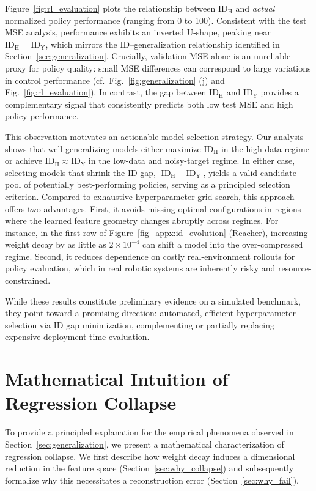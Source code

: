 \documentclass{article}
\newcommand{\idh}{\ensuremath{\mathrm{ID}_{\mathrm{H}}}}
\newcommand{\idy}{\ensuremath{\mathrm{ID}_{\mathrm{Y}}}}
\theoremstyle{plain}
\theoremstyle{definition}
\theoremstyle{remark}
\begin{document}
Figure~\ref{fig:rl_evaluation} plots the relationship between $\idh$ and \emph{actual} normalized policy performance (ranging from 0 to 100). Consistent with the test MSE analysis, performance exhibits an inverted U-shape, peaking near $\idh = \idy$, which mirrors the ID--generalization relationship identified in Section~\ref{sec:generalization}. Crucially, validation MSE alone is an unreliable proxy for policy quality: small MSE differences can correspond to large variations in control performance (cf.\ Fig.~\ref{fig:generalization} (j) and Fig.~\ref{fig:rl_evaluation}). In contrast, the gap between $\idh$ and $\idy$ provides a complementary signal that consistently predicts both low test MSE and high policy performance.

This observation motivates an actionable model selection strategy. Our analysis shows that well-generalizing models either maximize $\idh$ in the high-data regime or achieve $\idh \approx \idy$ in the low-data and noisy-target regime. In either case, selecting models that shrink the ID gap, $|\idh - \idy|$, yields a valid candidate pool of potentially best-performing policies, serving as a principled selection criterion. Compared to exhaustive hyperparameter grid search, this approach offers two advantages. First, it avoids missing optimal configurations in regions where the learned feature geometry changes abruptly across regimes. For instance, in the first row of Figure~\ref{fig_appx:id_evolution} (Reacher), increasing weight decay by as little as $2 \times 10^{-4}$ can shift a model into the over-compressed regime. Second, it reduces dependence on costly real-environment rollouts for policy evaluation, which in real robotic systems are inherently risky and resource-constrained.

While these results constitute preliminary evidence on a simulated benchmark, they point toward a promising direction: automated, efficient hyperparameter selection via ID gap minimization, complementing or partially replacing expensive deployment-time evaluation.


\section{Mathematical Intuition of Regression Collapse}
\label{sec:mathematical_analysis}

To provide a principled explanation for the empirical phenomena observed in Section~\ref{sec:generalization}, we present a mathematical characterization of regression collapse. We first describe how weight decay induces a dimensional reduction in the feature space (Section~\ref{sec:why_collapse}) and subsequently formalize why this necessitates a reconstruction error (Section~\ref{sec:why_fail}).
\end{document}
